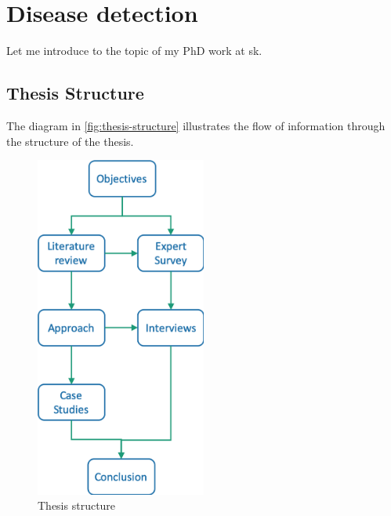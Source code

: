 \chapter{Disease detection}

Let me introduce to the topic of my PhD work at \acrfull{sk}.


\section{Thesis Structure}
The diagram in \autoref{fig:thesis-structure} illustrates the flow of information through the structure of the thesis.

\begin{figure}[htb!]
\centering \includegraphics[width=0.5\textwidth]{graphics/thesis-structure}
\caption{Thesis structure}
\label{fig:thesis-structure}
\end{figure}

